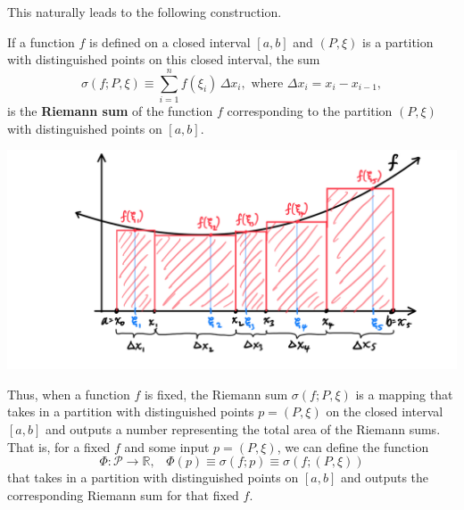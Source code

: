\documentclass{article}
\begin{document}
      This naturally leads to the following construction. 

      \begin{definition}
        If a function $f$ is defined on a closed interval $[a, b]$ and $(P, \xi)$ is a partition with distinguished points on this closed interval, the sum
        \[\sigma(f; P, \xi) \equiv \sum_{i=1}^n f(\xi_i)\, \Delta x_i, \text{ where } \Delta x_i = x_i - x_{i-1},\]
        is the \textbf{Riemann sum} of the function $f$ corresponding to the partition $(P, \xi)$ with distinguished points on $[a, b]$. 
        \begin{center}
            \includegraphics[scale=0.25]{img/Riemann_Sum_with_Partitions_Points.PNG}
        \end{center}
        Thus, when a function $f$ is fixed, the Riemann sum $\sigma (f; P, \xi)$ is a mapping that takes in a partition with distinguished points $p = (P, \xi)$ on the closed interval $[a, b]$ and outputs a number representing the total area of the Riemann sums. That is, for a fixed $f$ and some input $p = (P, \xi)$, we can define the function 
        \[\Phi: \mathcal{P} \longrightarrow \mathbb{R}, \;\;\; \Phi(p) \equiv \sigma(f; p) \equiv \sigma(f; (P, \xi))\]
        that takes in a partition with distinguished points on $[a,b]$ and outputs the corresponding Riemann sum for that fixed $f$. 
      \end{definition}
\end{document}
